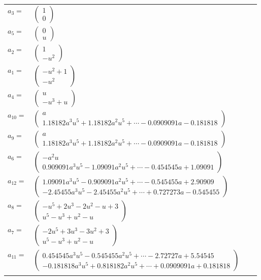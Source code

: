 \documentclass[1p]{elsarticle_modified}
\theoremstyle{definition}
\begin{document}
\begin{tabular}{m{7pt} m{180pt} m{7pt} m{180pt} }
\flushright $a_{3}=$&$\begin{pmatrix}1\\0\end{pmatrix}$ \\
\flushright $a_{5}=$&$\begin{pmatrix}0\\u\end{pmatrix}$ \\
\flushright $a_{2}=$&$\begin{pmatrix}1\\- u^2\end{pmatrix}$ \\
\flushright $a_{1}=$&$\begin{pmatrix}- u^2+1\\- u^2\end{pmatrix}$ \\
\flushright $a_{4}=$&$\begin{pmatrix}u\\- u^3+u\end{pmatrix}$ \\
\flushright $a_{10}=$&$\begin{pmatrix}a\\1.18182 a^{3} u^{5}+1.18182 a^{2} u^{5}+\cdots-0.0909091 a-0.181818\end{pmatrix}$ \\
\flushright $a_{9}=$&$\begin{pmatrix}a\\1.18182 a^{3} u^{5}+1.18182 a^{2} u^{5}+\cdots-0.0909091 a-0.181818\end{pmatrix}$ \\
\flushright $a_{6}=$&$\begin{pmatrix}- a^2 u\\0.909091 a^{3} u^{5}-1.09091 a^{2} u^{5}+\cdots-0.454545 a+1.09091\end{pmatrix}$ \\
\flushright $a_{12}=$&$\begin{pmatrix}1.09091 a^{3} u^{5}-0.909091 a^{2} u^{5}+\cdots-0.545455 a+2.90909\\-2.45455 a^{3} u^{5}-2.45455 a^{2} u^{5}+\cdots+0.727273 a-0.545455\end{pmatrix}$ \\
\flushright $a_{8}=$&$\begin{pmatrix}- u^5+2 u^3-2 u^2- u+3\\u^5- u^3+u^2- u\end{pmatrix}$ \\
\flushright $a_{7}=$&$\begin{pmatrix}-2 u^5+3 u^3-3 u^2+3\\u^5- u^3+u^2- u\end{pmatrix}$ \\
\flushright $a_{11}=$&$\begin{pmatrix}0.454545 a^{3} u^{5}-0.545455 a^{2} u^{5}+\cdots-2.72727 a+5.54545\\-0.181818 a^{3} u^{5}+0.818182 a^{2} u^{5}+\cdots+0.0909091 a+0.181818\end{pmatrix}$\\&\end{tabular}
\end{document}
